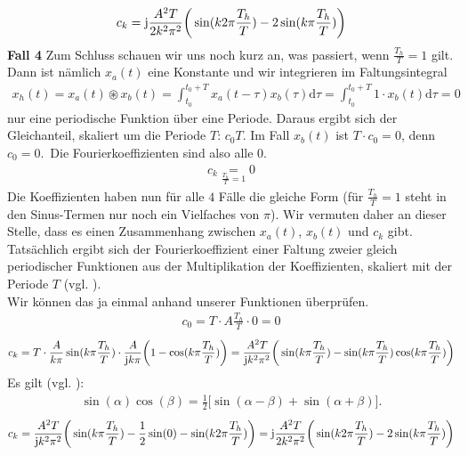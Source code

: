 \documentclass[11pt,a4paper,DIV=12]{scrartcl}
\newcommand{\diff}{\mathrm{d}}
\begin{document}
\begin{align}
	c_k=\im\frac{A^2T}{2k^2\pi^2}\bigg (\sin(k2\pi\frac{T_h}{T})-2\sin(k\pi\frac{T_h}{T})\bigg )
\end{align}
\textbf{Fall 4}
Zum Schluss schauen wir uns noch kurz an, was passiert, wenn $\frac{T_h}{T}=1$ gilt. Dann ist nämlich $x_{a}(t)$ eine Konstante und wir integrieren im Faltungsintegral
\begin{align}
	x_{h}(t)=x_{a}(t)\circledast x_{b}(t)=\int_{t_0}^{t_0+T}x_{a}(t-\tau)x_{b}(\tau)\diff \tau=\int_{t_0}^{t_0+T}1\cdot x_{b}(t)\diff \tau = 0
\end{align}
nur eine periodische Funktion über eine Periode. Daraus ergibt sich der Gleichanteil, skaliert um die Periode $T$: $c_0T$. Im Fall $x_b(t)$ ist $T\cdot c_0=0$, denn $c_0=0$.\
Die Fourierkoeffizienten sind also alle $0$.
\begin{align}
	c_k\underset{\frac{T_h}{T}=1}{=}0
\end{align}
Die Koeffizienten haben nun für alle $4$ Fälle die gleiche Form (für $\frac{T_h}{T}=1$ steht in den Sinus-Termen nur noch ein Vielfaches von $\pi$). Wir vermuten daher an dieser Stelle, dass es einen Zusammenhang zwischen $x_{a}(t)$, $x_{b}(t)$ und $c_k$ gibt.\\
Tatsächlich ergibt sich der Fourierkoeffizient einer Faltung zweier gleich periodischer Funktionen aus der Multiplikation der Koeffizienten, skaliert mit der Periode $T$ (vgl. \cite[Kap. 3, S. 208]{Oppenheim1997}).\\
Wir können das ja einmal anhand unserer Funktionen überprüfen.
\begin{align}
	c_0=T\cdot A\frac{T_h}{T}\cdot 0 =0
\end{align}
\begin{gather}
	c_k=T\cdot \frac{A}{k\pi}\sin(k\pi\frac{T_h}{T})\cdot\frac{A}{\im k \pi}\bigg (1-\cos(k\pi\frac{T_h}{T})\bigg )=\frac{A^2T}{\im k ^2\pi^2}\bigg(\sin(k\pi\frac{T_h}{T})-\sin(k\pi\frac{T_h}{T})\cos(k\pi\frac{T_h}{T})\bigg )
\end{gather}
Es gilt (vgl. \cite[Kap.2, S. 83]{Bronstein}):
\begin{gather}
	\sin(\alpha)\cos(\beta)=\frac{1}{2}\bigg [\sin(\alpha-\beta)+\sin(\alpha+\beta)\bigg ].
\end{gather}
\begin{gather}
	c_k=\frac{A^2T}{\im k^2\pi^2}\bigg (\sin(k\pi\frac{T_h}{T})-\frac{1}{2}\sin(0)-\sin(k2\pi\frac{T_h}{T})\bigg )=\im\frac{A^2T}{2k^2\pi^2}\bigg (\sin(k2\pi\frac{T_h}{T})-2\sin(k\pi\frac{T_h}{T})\bigg )
\end{gather}
\end{document}
